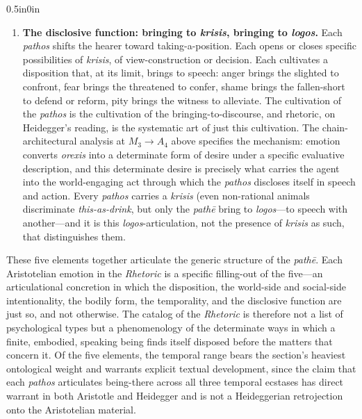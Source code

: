 \documentclass{article}
\begin{document}
\begin{adjustwidth}{0.5in}{0in}
\begin{enumerate}
        \item \textbf{The disclosive function: bringing to \textit{krisis}, bringing to \textit{logos}.} Each \textit{pathos} shifts the hearer toward taking-a-position. Each opens or closes specific possibilities of \textit{krisis}, of view-construction or decision. Each cultivates a disposition that, at its limit, brings to speech: anger brings the slighted to confront, fear brings the threatened to confer, shame brings the fallen-short to defend or reform, pity brings the witness to alleviate. The cultivation of the \textit{pathos} is the cultivation of the bringing-to-discourse, and rhetoric, on Heidegger's reading, is the systematic art of just this cultivation. The chain-architectural analysis at $M_3 \rightarrow A_4$ above specifies the mechanism: emotion converts \textit{orexis} into a determinate form of desire under a specific evaluative description, and this determinate desire is precisely what carries the agent into the world-engaging act through which the \textit{pathos} discloses itself in speech and action. Every \textit{pathos} carries a \textit{krisis} (even non-rational animals discriminate \textit{this-as-drink}, but only the \textit{pathē} bring to \textit{logos}---to speech with another---and it is this \textit{logos}-articulation, not the presence of \textit{krisis} as such, that distinguishes them.
    \end{enumerate}
\end{adjustwidth}

These five elements together articulate the generic structure of the \textit{pathē}. Each Aristotelian emotion in the \textit{Rhetoric} is a specific filling-out of the five---an articulational concretion in which the disposition, the world-side and social-side intentionality, the bodily form, the temporality, and the disclosive function are just so, and not otherwise. The catalog of the \textit{Rhetoric} is therefore not a list of psychological types but a phenomenology of the determinate ways in which a finite, embodied, speaking being finds itself disposed before the matters that concern it. Of the five elements, the temporal range bears the section's heaviest ontological weight and warrants explicit textual development, since the claim that each \textit{pathos} articulates being-there across all three temporal ecstases has direct warrant in both Aristotle and Heidegger and is not a Heideggerian retrojection onto the Aristotelian material.
\end{document}
